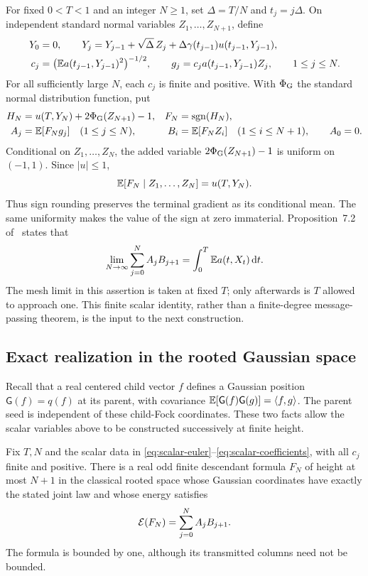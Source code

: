 For fixed $0<T<1$ and an integer $N\ge1$, set $\Delta=T/N$ and
$t_j=j\Delta$. On independent standard normal variables
$Z_1,\ldots,Z_{N+1}$, define
\begin{align}
 Y_0&=0,\qquad
 Y_j=Y_{j-1}+\sqrt\Delta\,Z_j
       +\Delta\gamma(t_{j-1})u(t_{j-1},Y_{j-1}), \label{eq:scalar-euler}\\
 c_j&=\bigl(\mathbb E a(t_{j-1},Y_{j-1})^2\bigr)^{-1/2},
 \qquad
 g_j=c_j a(t_{j-1},Y_{j-1})Z_j,\qquad 1\le j\le N.
 \label{eq:scalar-columns}
\end{align}
For all sufficiently large $N$, each $c_j$ is finite and positive.
With $\Phi_{\rm G}$ the standard normal distribution function, put
\begin{align}
 H_N&=u(T,Y_N)+2\Phi_{\rm G}(Z_{N+1})-1,
 &F_N&=\operatorname{sgn}(H_N), \label{eq:scalar-rounding}\\
 A_j&=\mathbb E[F_Ng_j]\quad(1\le j\le N),&
 B_i&=\mathbb E[F_NZ_i]\quad(1\le i\le N+1),\qquad A_0=0 .
 \label{eq:scalar-coefficients}
\end{align}
Conditional on $Z_1,\ldots,Z_N$, the added variable
$2\Phi_{\rm G}(Z_{N+1})-1$ is uniform on $(-1,1)$. Since $|u|\le1$,
\[
 \mathbb E[F_N\mid Z_1,\ldots,Z_N]=u(T,Y_N).
\]
Thus sign rounding preserves the terminal gradient as its conditional
mean. The same uniformity makes the value of the sign at zero
immaterial. Proposition~7.2 of~\cite{SKSupport2026} states that
\begin{equation}
 \lim_{N\to\infty}\sum_{j=0}^N A_jB_{j+1}
       =\int_0^T\mathbb E a(t,X_t)\,\mathrm d t.
 \label{eq:scalar-coefficient-limit}
\end{equation}
The mesh limit in this assertion is taken at fixed $T$; only
afterwards is $T$ allowed to approach one. This finite scalar
identity, rather than a finite-degree message-passing theorem, is
the input to the next construction.

\subsection{Exact realization in the rooted Gaussian space}

Recall that a real centered child vector $f$ defines a Gaussian
position $\mathsf G(f)=q(f)$ at its parent, with covariance
$\mathbb E[\mathsf G(f)\mathsf G(g)]=\langle f,g\rangle$.
The parent seed is independent of these child-Fock coordinates.
These two facts allow the scalar variables above to be constructed
successively at finite height.

\begin{lemma}
\label{lem:gaussian-rooted-realization}
Fix $T,N$ and the scalar data in
\eqref{eq:scalar-euler}--\eqref{eq:scalar-coefficients}, with all
$c_j$ finite and positive. There is a real odd finite descendant
formula $F_N$ of height at most $N+1$ in the classical rooted space
whose Gaussian coordinates have exactly the stated joint law and
whose energy satisfies
\begin{equation}
 \mathcal E(F_N)=\sum_{j=0}^N A_j B_{j+1}.
 \label{eq:scalar-rooted-energy}
\end{equation}
The formula is bounded by one, although its transmitted columns
need not be bounded.
\end{lemma}

